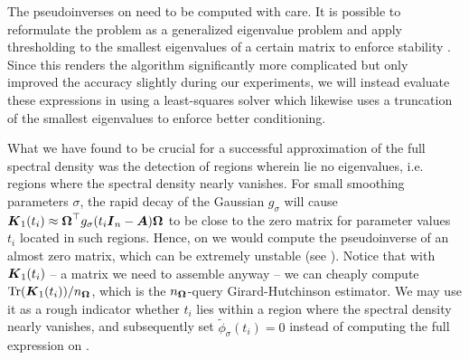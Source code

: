 \documentclass[12pt]{article}
\begin{document}



The pseudoinverses on  need to be computed with care. It is possible to reformulate the problem as a generalized eigenvalue problem and apply thresholding to the smallest eigenvalues of a certain matrix to enforce stability \cite{lin-2017-randomized-estimation, epperly-2022-theory-quantuma}. Since this renders the algorithm significantly more complicated but only improved the accuracy slightly during our experiments, we will instead evaluate these expressions in  using a least-squares solver which likewise uses a truncation of the smallest eigenvalues to enforce better conditioning.

What we have found to be crucial for a successful approximation of the full spectral density was the detection of regions wherein lie no eigenvalues, i.e. regions where the spectral density nearly vanishes. For small smoothing parameters $\sigma$, the rapid decay of the Gaussian $g_{\sigma}$ will cause $\boldsymbol{K}_1(t_i) \approx \boldsymbol{\Omega}^{\top} g_{\sigma}(t_i\boldsymbol{I}_n - \boldsymbol{A}) \boldsymbol{\Omega}$ to be close to the zero matrix for parameter values $t_i$ located in such regions. Hence, on  we would compute the pseudoinverse of an almost zero matrix, which can be extremely unstable (see ). Notice that with $\boldsymbol{K}_1(t_i)$ -- a matrix we need to assemble anyway -- we can cheaply compute $\operatorname{Tr}(\boldsymbol{K}_1(t_i)) / n_{\boldsymbol{\Omega}}$, which is the $n_{\boldsymbol{\Omega}}$-query Girard-Hutchinson estimator. We may use it as a rough indicator whether $t_i$ lies within a region where the spectral density nearly vanishes, and subsequently set $\widetilde{\phi}_{\sigma}(t_i) = 0$ instead of computing the full expression on .
\end{document}
